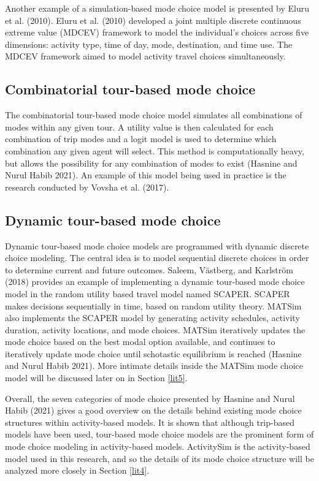 \documentclass[12pt, oneside, openright]{byuthesis}
\begin{document}
Another example of a simulation-based mode choice model is presented by Eluru et al. (2010). Eluru et al. (2010) developed a joint multiple discrete continuous extreme value (MDCEV) framework to model the individual's choices across five dimensions: activity type, time of day, mode, destination, and time use. The MDCEV framework aimed to model activity travel choices simultaneously.

\hypertarget{lit36}{%
\subsection{Combinatorial tour-based mode choice}\label{lit36}}

The combinatorial tour-based mode choice model simulates all combinations of modes within any given tour. A utility value is then calculated for each combination of trip modes and a logit model is used to determine which combination any given agent will select. This method is computationally heavy, but allows the possibility for any combination of modes to exist (Hasnine and Nurul Habib 2021). An example of this model being used in practice is the research conducted by Vovsha et al. (2017).

\hypertarget{lit37}{%
\subsection{Dynamic tour-based mode choice}\label{lit37}}

Dynamic tour-based mode choice models are programmed with dynamic discrete choice modeling. The central idea is to model sequential discrete choices in order to determine current and future outcomes. Saleem, Västberg, and Karlström (2018) provides an example of implementing a dynamic tour-based mode choice model in the random utility based travel model named SCAPER. SCAPER makes decisions sequentially in time, based on random utility theory. MATSim also implements the SCAPER model by generating activity schedules, activity duration, activity locations, and mode choices. MATSim iteratively updates the mode choice based on the best modal option available, and continues to iteratively update mode choice until schotastic equilibrium is reached (Hasnine and Nurul Habib 2021). More intimate details inside the MATSim mode choice model will be discussed later on in Section \ref{lit5}.

Overall, the seven categories of mode choice presented by Hasnine and Nurul Habib (2021) gives a good overview on the details behind existing mode choice structures within activity-based models. It is shown that although trip-based models have been used, tour-based mode choice models are the prominent form of mode choice modeling in activity-based models. ActivitySim is the activity-based model used in this research, and so the details of its mode choice structure will be analyzed more closely in Section \ref{lit4}.
\end{document}
